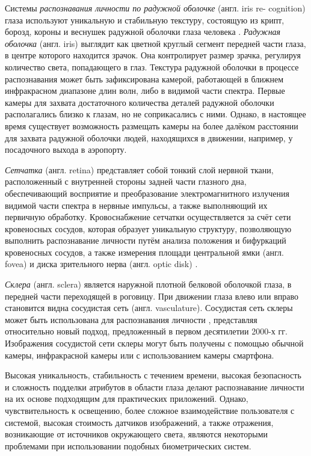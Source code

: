\documentclass[12pt]{book}
\begin{document}
\large{Системы \textit{распознавания личности по радужной оболочке} (англ. iris re- cognition) глаза используют уникальную и стабильную текстуру, состоящую из крипт, борозд, короны и веснушек радужной оболочки глаза человека \cite{unar_2014, minaee_2023, nguyen_2024}. \textit{Радужная оболочка} (англ. iris) выглядит как цветной круглый сегмент передней части глаза, в центре которого находится зрачок. Она контролирует размер зрачка, регулируя количество света, попадающего в глаз. Текстура радужной оболочки в процессе распознавания может быть зафиксирована камерой, работающей в ближнем инфракрасном диапазоне длин волн, либо в видимой части спектра. Первые камеры для захвата достаточного количества деталей радужной оболочки располагались близко к глазам, но не соприкасались с ними. Однако, в настоящее время существует возможность размещать камеры на более далёком расстоянии для захвата радужной оболочки людей, находящихся в движении, например, у посадочного выхода в аэропорту.}

\large{\textit{Сетчатка} (англ. retina) представляет собой тонкий слой нервной ткани, расположенный с внутренней стороны задней части глазного дна, обеспечивающий восприятие и преобразование электромагнитного излучения видимой части спектра в нервные импульсы, а также выполняющий их первичную обработку. Кровоснабжение сетчатки осуществляется за счёт сети кровеносных сосудов, которая образует уникальную структуру, позволяющую выполнить распознавание личности путём анализа положения и бифуркаций кровеносных сосудов, а также измерения площади центральной ямки (англ. fovea) и диска зрительного нерва (англ. optic disk) \cite{unar_2014}.}

\large{\textit{Склера} (англ. sclera) является наружной плотной белковой оболочкой глаза, в передней части переходящей в роговицу. При движении глаза влево или вправо становится видна сосудистая сеть (англ. vasculature). Сосудистая сеть склеры может быть использована для распознавания личности \cite{unar_2014, rot_2020, derakhshani_2006}, представляя относительно новый подход, предложенный в первом десятилетии 2000-х гг. Изображения сосудистой сети склеры могут быть получены с помощью обычной камеры, инфракрасной камеры или с использованием камеры смартфона.}

\large{Высокая уникальность, стабильность с течением времени, высокая безопасность и сложность подделки атрибутов в области глаза делают распознавание личности на их основе подходящим для практических приложений. Однако, чувствительность к освещению, более сложное взаимодействие пользователя с системой, высокая стоимость датчиков изображений, а также отражения, возникающие от источников окружающего света, являются некоторыми проблемами при использовании подобных биометрических систем.}
\end{document}
